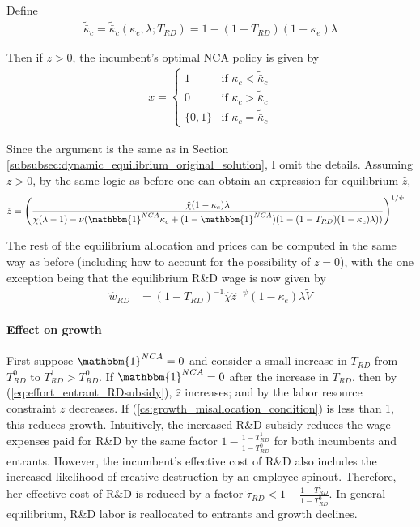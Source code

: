 \documentclass[11pt,english]{article}
\begin{document}
Define
\begin{align}
\tilde{\bar{\kappa}}_c = \tilde{\bar{\kappa}}_c(\kappa_e,\lambda;T_{RD}) = 1 - (1-T_{RD})(1-\kappa_e)\lambda
\end{align} 

Then if $z > 0$, the incumbent's optimal NCA policy is given by 
\begin{align}
x = \begin{cases}
1 & \textrm{if } \kappa_{c} < \tilde{\bar{\kappa}}_c  \\
0 & \textrm{if } \kappa_{c} > \tilde{\bar{\kappa}}_c \\
\{0,1\} & \textrm{if } \kappa_c = \tilde{\bar{\kappa}}_c 
\end{cases} \label{eq:nca_policy_RDsubsidy}
\end{align}

Since the argument is the same as in Section \ref{subsubsec:dynamic_equilibrium_original_solution}, I omit the details. Assuming $z > 0$, by the same logic as before one can obtain an expression for equilibrium $\hat{z}$, 
\begin{align}
\hat{z} &= \Bigg( \frac{\hat{\chi} (1-\kappa_{e}) \lambda}{\chi(\lambda -1) - \nu (\mathbbm{1}^{NCA}\kappa_c + (1-\mathbbm{1}^{NCA})(1 - (1-T_{RD})(1-\kappa_e)\lambda)) } \Bigg)^{1/\psi} \label{eq:effort_entrant_RDsubsidy}
\end{align}

The rest of the equilibrium allocation and prices can be computed in the same way as before (including how to account for the possibility of $z = 0$), with the one exception being that the equilibrium R\&D wage is now given by 
\begin{align}
\hat{w}_{RD} &= (1-T_{RD})^{-1}\hat{\chi} \hat{z}^{-\psi} (1-\kappa_e) \lambda \tilde{V} \label{eq:wage_rd_labor_RDsubsidy}
\end{align}

\paragraph{Effect on growth}

First suppose $\mathbbm{1}^{NCA} = 0$ and consider a small increase in $T_{RD}$ from $T_{RD}^0$ to $T_{RD}^1 > T_{RD}^0$. If $\mathbbm{1}^{NCA} = 0$ after the increase in $T_{RD}$, then by (\ref{eq:effort_entrant_RDsubsidy}), $\hat{z}$ increases; and by the labor resource constraint $z$ decreases. If (\ref{cs:growth_misallocation_condition}) is less than 1, this reduces growth. Intuitively, the increased R\&D subsidy reduces the wage expenses paid for R\&D by the same factor $1-\frac{1-T_{RD}^1}{1-T_{RD}^0}$ for both incumbents and entrants. However, the incumbent's effective cost of R\&D also includes the increased likelihood of creative destruction by an employee spinout. Therefore, her effective cost of R\&D is reduced by a factor $\tilde{\tau}_{RD} < 1-\frac{1-T_{RD}^1}{1-T_{RD}^0}$. In general equilibrium, R\&D labor is reallocated to entrants and growth declines.
\end{document}
